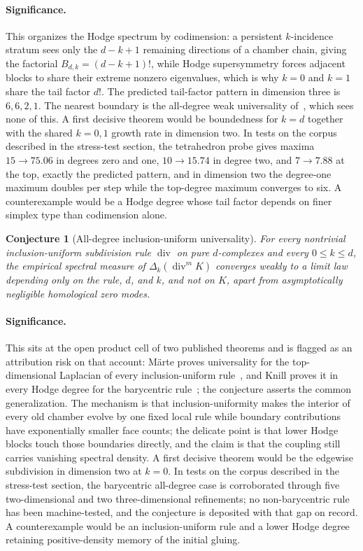 \documentclass[11pt]{article}
\newtheorem{conjecture}{Conjecture}
\theoremstyle{definition}
\begin{document}
\paragraph{Significance.}
This organizes the Hodge spectrum by codimension: a persistent $k$-incidence stratum sees only the $d-k+1$ remaining directions of a chamber chain, giving the factorial $B_{d,k}=(d-k+1)!$, while Hodge supersymmetry forces adjacent blocks to share their extreme nonzero eigenvalues, which is why $k=0$ and $k=1$ share the tail factor $d!$.  The predicted tail-factor pattern in dimension three is $6,6,2,1$.  The nearest boundary is the all-degree weak universality of~\cite{Kn17}, which sees none of this.  A first decisive theorem would be boundedness for $k=d$ together with the shared $k=0,1$ growth rate in dimension two.  In tests on the corpus described in the stress-test section, the tetrahedron probe gives maxima $15\to75.06$ in degrees zero and one, $10\to15.74$ in degree two, and $7\to7.88$ at the top, exactly the predicted pattern, and in dimension two the degree-one maximum doubles per step while the top-degree maximum converges to six.  A counterexample would be a Hodge degree whose tail factor depends on finer simplex type than codimension alone.

\begin{conjecture}[All-degree inclusion-uniform universality]\label{ac3}
For every nontrivial inclusion-uniform subdivision rule $\operatorname{div}$ on pure $d$-complexes and every $0\le k\le d$, the empirical spectral measure of $\Delta_k(\operatorname{div}^mK)$ converges weakly to a limit law depending only on the rule, $d$, and $k$, and not on $K$, apart from asymptotically negligible homological zero modes.
\end{conjecture}

\paragraph{Significance.}
This sits at the open product cell of two published theorems and is flagged as an attribution risk on that account: M\"arte proves universality for the top-dimensional Laplacian of every inclusion-uniform rule~\cite{Mar22}, and Knill proves it in every Hodge degree for the barycentric rule~\cite{Kn17}; the conjecture asserts the common generalization.  The mechanism is that inclusion-uniformity makes the interior of every old chamber evolve by one fixed local rule while boundary contributions have exponentially smaller face counts; the delicate point is that lower Hodge blocks touch those boundaries directly, and the claim is that the coupling still carries vanishing spectral density.  A first decisive theorem would be the edgewise subdivision in dimension two at $k=0$.  In tests on the corpus described in the stress-test section, the barycentric all-degree case is corroborated through five two-dimensional and two three-dimensional refinements; no non-barycentric rule has been machine-tested, and the conjecture is deposited with that gap on record.  A counterexample would be an inclusion-uniform rule and a lower Hodge degree retaining positive-density memory of the initial gluing.
\end{document}

